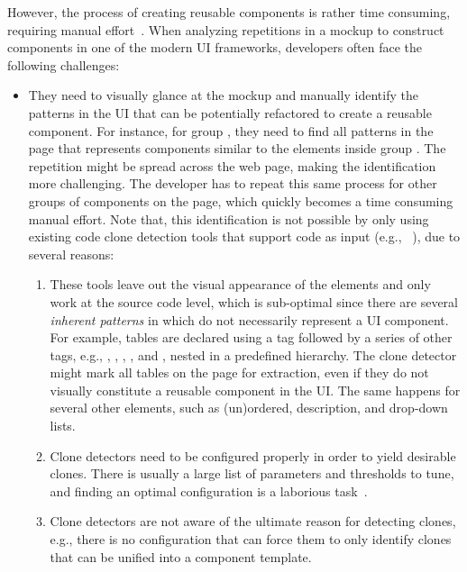However, the process of creating reusable components is rather time consuming, 
requiring manual effort~\cite{thinking:in:components}.
When analyzing repetitions in a mockup
to construct components in one of the modern UI frameworks,
developers often face the following challenges:
\begin{itemize}[leftmargin=*]
	\item They need to visually glance at the mockup and manually identify the patterns in the UI
	that can be potentially refactored to create a reusable component.
	For instance, for group , they need to find all patterns in 
	the page that represents components similar to the elements inside
	group .
	The repetition might be spread across the web page,
	making the identification more challenging.
	The developer has to repeat this same process for other groups of components on the page, which quickly becomes a time consuming manual effort. 
	Note that, this identification is not possible by only using existing code clone detection tools
	that support \html code as input (e.g., \nicad~\cite{Roy:2008:NiCad}),
	due to several reasons:
	
	\begin{enumerate}[leftmargin=*]
		\item These tools leave out the visual appearance of the elements 
	and only work at the source code level, which is sub-optimal since there are several \textit{inherent patterns}
	in \html which do not necessarily represent a UI component. 
	For example, \html tables are declared using a  tag
	followed by a series of other tags, e.g., 
	, , 
	,
	, and ,
	nested in a predefined hierarchy.
	The clone detector might mark all tables on the page for extraction, even if they do not visually constitute a reusable component in the UI.
	The same happens for several other elements, such as (un)ordered, description, and drop-down lists.	

	\item Clone detectors need to be configured properly in order to yield desirable clones.
	There is usually a large list of parameters and thresholds to tune,
	and finding an optimal configuration is a laborious task~\cite{Wang:2013:SearchingForBetterConfigs}.
	
	\item Clone detectors are not aware of the ultimate reason for detecting clones,
	e.g., there is no configuration that can force them to only identify clones that can be unified into a component template. 


\end{enumerate}
\end{itemize}
